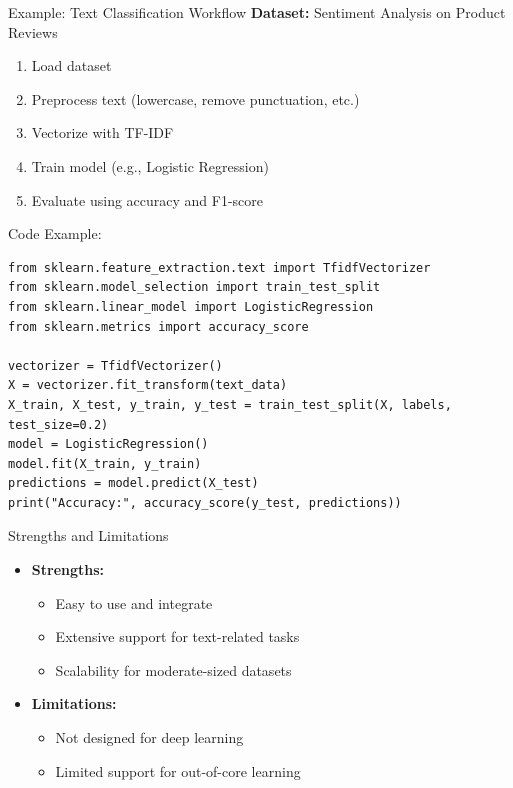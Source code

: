 	\begin{frame}{Example: Text Classification Workflow}
		\textbf{Dataset:} Sentiment Analysis on Product Reviews
		\begin{enumerate}
			\item Load dataset
			\item Preprocess text (lowercase, remove punctuation, etc.)
			\item Vectorize with TF-IDF
			\item Train model (e.g., Logistic Regression)
			\item Evaluate using accuracy and F1-score
		\end{enumerate}
\end{frame}
		\begin{frame}[fragile]{Code Example:}
		\begin{lstlisting}
from sklearn.feature_extraction.text import TfidfVectorizer
from sklearn.model_selection import train_test_split
from sklearn.linear_model import LogisticRegression
from sklearn.metrics import accuracy_score

vectorizer = TfidfVectorizer()
X = vectorizer.fit_transform(text_data)
X_train, X_test, y_train, y_test = train_test_split(X, labels, test_size=0.2)
model = LogisticRegression()
model.fit(X_train, y_train)
predictions = model.predict(X_test)
print("Accuracy:", accuracy_score(y_test, predictions))
		\end{lstlisting}
	\end{frame}
	
	\begin{frame}{Strengths and Limitations}
		\begin{itemize}
			\item \textbf{Strengths:}
			\begin{itemize}
				\item Easy to use and integrate
				\item Extensive support for text-related tasks
				\item Scalability for moderate-sized datasets
			\end{itemize}
			\item \textbf{Limitations:}
			\begin{itemize}
				\item Not designed for deep learning
				\item Limited support for out-of-core learning
			\end{itemize}
		\end{itemize}
	\end{frame}
	
